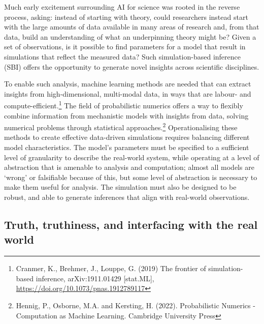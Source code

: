 Much early excitement surrounding AI for science was rooted in the
reverse process, asking: instead of starting with theory, could
researchers instead start with the large amounts of data available in
many areas of research and, from that data, build an understanding of
what an underpinning theory might be? Given a set of observations, is it
possible to find parameters for a model that result in simulations that
reflect the measured data? Such simulation-based inference (SBI) offers
the opportunity to generate novel insights across scientific
disciplines.

To enable such analysis, machine learning methods are needed that can
extract insights from high-dimensional, multi-modal data, in ways that
are labour- and compute-efficient.\footnote{Cranmer, K., Brehmer, J.,
  Louppe, G. (2019) The frontier of simulation-based inference,
  arXiv:1911.01429 {[}stat.ML{]},
  \url{https://doi.org/10.1073/pnas.1912789117}} The field of
probabilistic numerics offers a way to flexibly combine information from
mechanistic models with insights from data, solving numerical problems
through statistical approaches.\footnote{Hennig, P., Osborne, M.A. and
  Kersting, H. (2022). Probabilistic Numerics - Computation as Machine
  Learning. Cambridge University Press} Operationalising these methods
to create effective data-driven simulations requires balancing different
model characteristics. The model's parameters must be specified to a
sufficient level of granularity to describe the real-world system, while
operating at a level of abstraction that is amenable to analysis and
computation; almost all models are `wrong' or falsifiable because of
this, but some level of abstraction is necessary to make them useful for
analysis. The simulation must also be designed to be robust, and able to
generate inferences that align with real-world observations.

\subsection{Truth, truthiness, and interfacing with the real
world}\label{truth-truthiness-and-interfacing-with-the-real-world}

